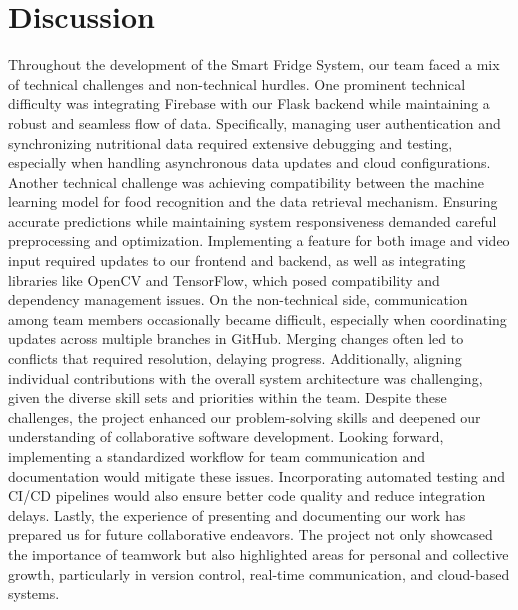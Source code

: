 \documentclass[conference]{IEEEtran}
\begin{document}
\section{Discussion}
Throughout the development of the Smart Fridge System, our team faced a mix of technical challenges and non-technical hurdles. One prominent technical difficulty was integrating Firebase with our Flask backend while maintaining a robust and seamless flow of data. Specifically, managing user authentication and synchronizing nutritional data required extensive debugging and testing, especially when handling asynchronous data updates and cloud configurations.
\newline
Another technical challenge was achieving compatibility between the machine learning model for food recognition and the data retrieval mechanism. Ensuring accurate predictions while maintaining system responsiveness demanded careful preprocessing and optimization. Implementing a feature for both image and video input required updates to our frontend and backend, as well as integrating libraries like OpenCV and TensorFlow, which posed compatibility and dependency management issues.
\newline
On the non-technical side, communication among team members occasionally became difficult, especially when coordinating updates across multiple branches in GitHub. Merging changes often led to conflicts that required resolution, delaying progress. Additionally, aligning individual contributions with the overall system architecture was challenging, given the diverse skill sets and priorities within the team.
\newline
Despite these challenges, the project enhanced our problem-solving skills and deepened our understanding of collaborative software development. Looking forward, implementing a standardized workflow for team communication and documentation would mitigate these issues. Incorporating automated testing and CI/CD pipelines would also ensure better code quality and reduce integration delays.
\newline
Lastly, the experience of presenting and documenting our work has prepared us for future collaborative endeavors. The project not only showcased the importance of teamwork but also highlighted areas for personal and collective growth, particularly in version control, real-time communication, and cloud-based systems.
\newline


    

\newpage
\end{document}
